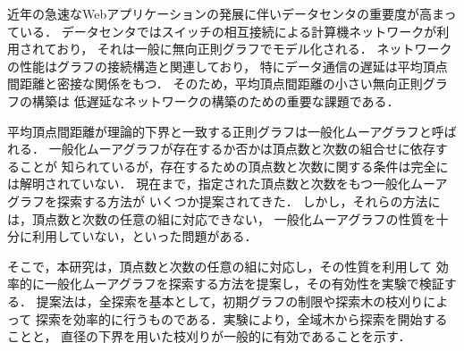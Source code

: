 
近年の急速なWebアプリケーションの発展に伴いデータセンタの重要度が高まっている．
データセンタではスイッチの相互接続による計算機ネットワークが利用されており，
それは一般に無向正則グラフでモデル化される．
ネットワークの性能はグラフの接続構造と関連しており，
特にデータ通信の遅延は平均頂点間距離と密接な関係をもつ．
そのため，平均頂点間距離の小さい無向正則グラフの構築は
低遅延なネットワークの構築のための重要な課題である．

平均頂点間距離が理論的下界と一致する正則グラフは一般化ムーアグラフと呼ばれる．
一般化ムーアグラフが存在するか否かは頂点数と次数の組合せに依存することが
知られているが，存在するための頂点数と次数に関する条件は完全には解明されていない．
現在まで，指定された頂点数と次数をもつ一般化ムーアグラフを探索する方法が
いくつか提案されてきた．
しかし，それらの方法には，頂点数と次数の任意の組に対応できない，
一般化ムーアグラフの性質を十分に利用していない，といった問題がある．

そこで，本研究は，頂点数と次数の任意の組に対応し，その性質を利用して
効率的に一般化ムーアグラフを探索する方法を提案し，その有効性を実験で検証する．
提案法は，全探索を基本として，初期グラフの制限や探索木の枝刈りによって
探索を効率的に行うものである．実験により，全域木から探索を開始することと，
直径の下界を用いた枝刈りが一般的に有効であることを示す．
